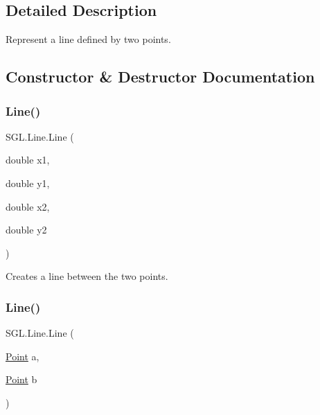 \subsection{Detailed Description}
Represent a line defined by two points. 



\subsection{Constructor \& Destructor Documentation}
\mbox{\label{class_s_g_l_1_1_line_a8223479d92d17240ca099e57a3db2fb8}} 
\subsubsection{\texorpdfstring{Line()}{Line()}\hspace{0.1cm}{\footnotesize\ttfamily [1/2]}}
{\footnotesize\ttfamily S\+G\+L.\+Line.\+Line (\begin{DoxyParamCaption}\item[{double}]{x1,  }\item[{double}]{y1,  }\item[{double}]{x2,  }\item[{double}]{y2 }\end{DoxyParamCaption})\hspace{0.3cm}{\ttfamily [inline]}}



Creates a line between the two points. 

\mbox{\label{class_s_g_l_1_1_line_aa8638f980f735da597505f73105c8b44}} 
\subsubsection{\texorpdfstring{Line()}{Line()}\hspace{0.1cm}{\footnotesize\ttfamily [2/2]}}
{\footnotesize\ttfamily S\+G\+L.\+Line.\+Line (\begin{DoxyParamCaption}\item[{\mbox{\hyperlink{struct_s_g_l_1_1_point}{Point}}}]{a,  }\item[{\mbox{\hyperlink{struct_s_g_l_1_1_point}{Point}}}]{b }\end{DoxyParamCaption})\hspace{0.3cm}{\ttfamily [inline]}}



